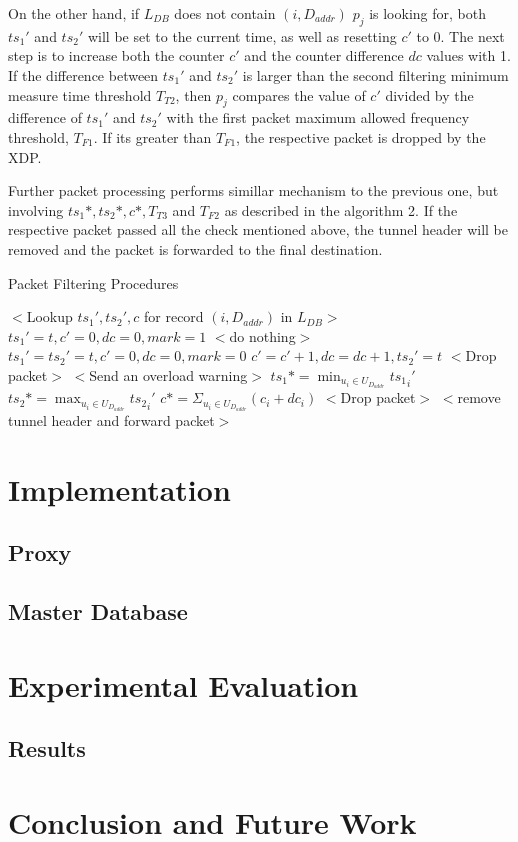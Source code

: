 \documentclass[sigplan,screen]{acmart}
\begin{document}
On the other hand, if $L_{DB}$ does not contain $(i, D_{addr})$ $p_j$ is looking for, both $ts_1'$ and $ts_2'$ will be set to the current time, as well as resetting $c'$ to 0. The next step is to increase both the counter $c'$ and the counter difference $dc$ values with 1. If the difference between $ts_1'$ and $ts_2'$ is larger than the second filtering minimum measure time threshold $T_{T2}$, then $p_j$ compares the value of $c'$ divided by the difference of $ts_1'$ and $ts_2'$ with the first packet maximum allowed frequency threshold, $T_{F1}$. If its greater than $T_{F1}$, the respective packet is dropped by the XDP. 

Further packet processing performs simillar mechanism to the previous one, but involving $ts_1*, ts_2*, c*, T_{T3}$ and $T_{F2}$ as described in the algorithm 2. If the respective packet passed all the check mentioned above, the tunnel header will be removed and the packet is forwarded to the final destination.  
\begin{algorithm}
\caption{Packet Filtering Procedures}
\begin{algorithmic}[1]
\State $<$Lookup $ts_1', ts_2',c$ for record $(i,D_{addr})$ in $L_{DB}>$
		\State $ts_1'=t,c'=0,dc=0,mark=1$
	\Else
		\State $<$do nothing$>$
	\EndIf
\Else
\State $ts_1'=ts_2'=t, c'=0, dc=0, mark=0$
\EndIf
\State $c'=c'+1, dc=dc+1, ts_2'=t$
		\State $<$Drop packet$>$
		\State $<$Send an overload warning$>$
	\EndIf
\EndIf
\State $ts_1* = \min_{u_i \in U_{D_{addr}}} {ts_1}_i'$
\State $ts_2* = \max_{u_i \in U_{D_{addr}}} {ts_2}_i'$
\State $c* = \Sigma_{u_i \in U_{D_{addr}}} (c_i+dc_i)$
		\State $<$Drop packet$>$
	\EndIf
\EndIf
\State $<$remove tunnel header and forward packet$>$
\end{algorithmic}
\end{algorithm}

\section{Implementation}
\subsection{Proxy}
\subsection{Master Database}

\section{Experimental Evaluation}

\subsection{Results}

\section{Conclusion and Future Work}



\end{document}
